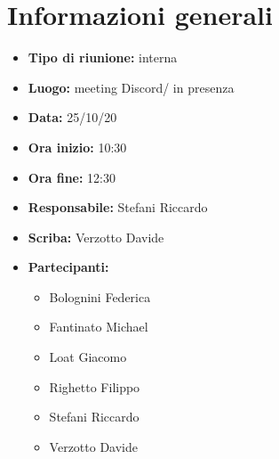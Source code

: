 \section{Informazioni generali}

\begin{itemize}
    \item \textbf{Tipo di riunione:} interna
    \item \textbf{Luogo:} meeting Discord/ in presenza
    \item \textbf{Data:} 25/10/20
    \item \textbf{Ora inizio:} 10:30
    \item \textbf{Ora fine:} 12:30
    \item \textbf{Responsabile:} Stefani Riccardo
    \item \textbf{Scriba:} Verzotto Davide
    \item \textbf{Partecipanti:}
    \begin{itemize}
        \renewcommand{\labelitemii}{--}
        \item Bolognini Federica
        \item Fantinato Michael
        \item Loat Giacomo
        \item Righetto Filippo
        \item Stefani Riccardo
        \item Verzotto Davide
    \end{itemize}
\end{itemize}
